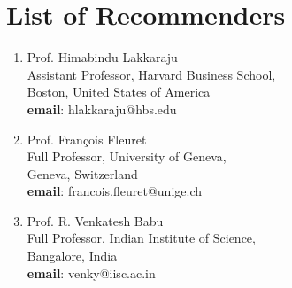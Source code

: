 \documentclass{article}
\begin{document}
\section*{List of Recommenders}

\begin{enumerate}
    \item Prof. Himabindu Lakkaraju
    \\Assistant Professor, Harvard Business School,
    \\Boston, United States of America
    \\\textbf{email}: hlakkaraju@hbs.edu

    \item Prof. Fran\c{c}ois Fleuret
    \\Full Professor, University of Geneva,
    \\Geneva, Switzerland
    \\\textbf{email}: francois.fleuret@unige.ch

    \item Prof. R. Venkatesh Babu
    \\Full Professor, Indian Institute of Science,
    \\Bangalore, India
    \\\textbf{email}: venky@iisc.ac.in
\end{enumerate}
\end{document}
